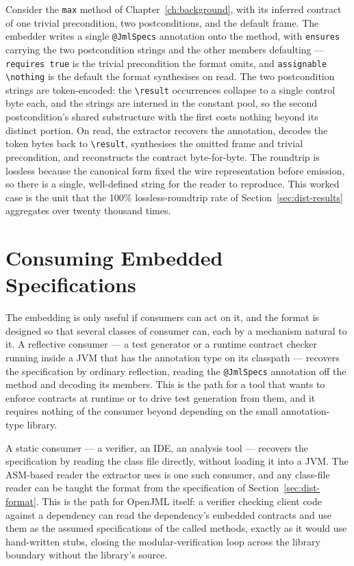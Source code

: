 Consider the \texttt{max} method of Chapter~\ref{ch:background}, with its
inferred contract of one trivial precondition, two postconditions, and the
default frame. The embedder writes a single \texttt{@JmlSpecs} annotation onto
the method, with \texttt{ensures} carrying the two postcondition strings and the
other members defaulting --- \texttt{requires true} is the trivial precondition
the format omits, and \texttt{assignable \textbackslash nothing} is the default
the format synthesises on read. The two postcondition strings are token-encoded:
the \texttt{\textbackslash result} occurrences collapse to a single control byte
each, and the strings are interned in the constant pool, so the second
postcondition's shared substructure with the first costs nothing beyond its
distinct portion. On read, the extractor recovers the annotation, decodes the
token bytes back to \texttt{\textbackslash result}, synthesises the omitted frame
and trivial precondition, and reconstructs the contract byte-for-byte. The
roundtrip is lossless because the canonical form fixed the wire representation
before emission, so there is a single, well-defined string for the reader to
reproduce. This worked case is the unit that the 100\% lossless-roundtrip rate
of Section~\ref{sec:dist-results} aggregates over twenty thousand times.

\section{Consuming Embedded Specifications}
\label{sec:dist-consume}

The embedding is only useful if consumers can act on it, and the format is
designed so that several classes of consumer can, each by a mechanism natural to
it. A reflective consumer --- a test generator or a runtime contract checker
running inside a JVM that has the annotation type on its classpath --- recovers
the specification by ordinary reflection, reading the \texttt{@JmlSpecs}
annotation off the method and decoding its members. This is the path for a tool
that wants to enforce contracts at runtime or to drive test generation from them,
and it requires nothing of the consumer beyond depending on the small annotation-
type library.

A static consumer --- a verifier, an IDE, an analysis tool --- recovers the
specification by reading the class file directly, without loading it into a JVM.
The ASM-based reader the extractor uses is one such consumer, and any class-file
reader can be taught the format from the specification of
Section~\ref{sec:dist-format}. This is the path for OpenJML itself: a verifier
checking client code against a dependency can read the dependency's embedded
contracts and use them as the assumed specifications of the called methods,
exactly as it would use hand-written stubs, closing the modular-verification loop
across the library boundary without the library's source.

